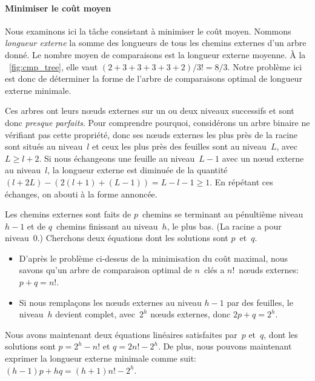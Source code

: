 \paragraph{Minimiser le coût moyen}
\label{par:opt_sort_minimean}

Nous examinons ici la tâche consistant à minimiser le coût
moyen. Nommons \emph{longueur
  externe}\label{sorting__external_path_length}  la somme des longueurs de tous les chemins
externes d'un arbre donné. Le nombre moyen de comparaisons est la
longueur externe moyenne. À la \fig~\vref{fig:cmp_tree}, elle vaut
\((2+3+3+3+3+2)/3!=8/3\). Notre problème ici est donc de déterminer la
forme de l'arbre de comparaisons optimal de longueur externe minimale.

Ces arbres ont leurs n{\oe}uds externes sur un ou deux niveaux
successifs et sont donc \emph{presque parfaits}. Pour comprendre pourquoi,
considérons un arbre binaire ne vérifiant pas cette propriété, donc
ses n{\oe}uds externes les plus près de la racine sont situés au
niveau~\(l\) et ceux les plus près des feuilles sont au niveau~\(L\),
avec \(L \geqslant l + 2\). Si nous échangeons une feuille au
niveau~\(L-1\) avec un n{\oe}ud externe au niveau~\(l\), la longueur
externe est diminuée de la quantité \((l+2L) - (2(l+1) + (L-1)) = L -
l - 1 \geqslant 1\). En répétant ces échanges, on abouti à la forme
annoncée.

Les chemins externes sont faits de \(p\)~chemins se terminant au
pénultième niveau~\(h-1\) et de \(q\)~chemins finissant au
niveau~\(h\), le plus bas. (La racine a pour niveau~\(0\).) Cherchons
deux équations dont les solutions sont \(p\)~et~\(q\).
\begin{itemize}

  \item D'après le problème ci-dessus de la minimisation du coût
    maximal, nous savons qu'un arbre de comparaison optimal de
    \(n\)~clés a \(n!\)~n{\oe}uds externes: \(p+q=n!\).

  \item Si nous remplaçons les n{\oe}uds externes au niveau \(h-1\)
    par des feuilles, le niveau~\(h\) devient complet, avec~\(2^h\)
    n{\oe}uds externes, donc \(2p+q=2^h\).

\end{itemize}
Nous avons maintenant deux équations linéaires satisfaites par~\(p\)
et~\(q\), dont les solutions sont \(p=2^h-n!\) et \(q=2n!-2^h\). De
plus, nous pouvons maintenant exprimer la longueur externe minimale
comme suit: \((h-1)p + hq = (h+1)n! - 2^h\).

